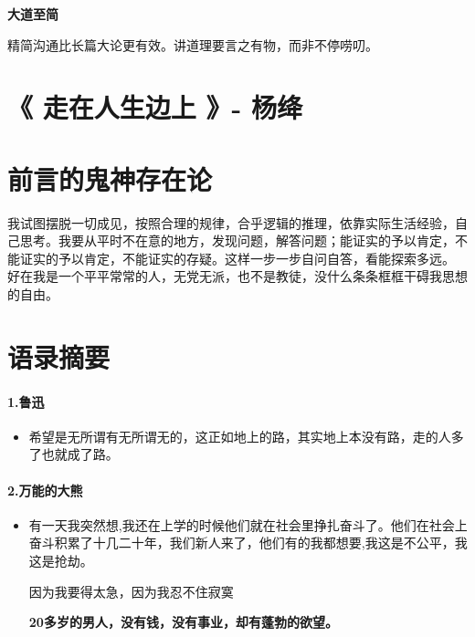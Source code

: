\documentclass[UTF8,a4paper,8pt]{ctexbook}
\begin{document}
		\textbf{大道至简}
		
		精简沟通比长篇大论更有效。讲道理要言之有物，而非不停唠叨。	
\newpage 
\section{《 走在人生边上 》- 杨绛 }
	\section{前言的鬼神存在论}
		我试图摆脱一切成见，按照合理的规律，合乎逻辑的推理，依靠实际生活经验，自己思考。我要从平时不在意的地方，发现问题，解答问题；能证实的予以肯定，不能证实的予以肯定，不能证实的存疑。这样一步一步自问自答，看能探索多远。
		好在我是一个平平常常的人，无党无派，也不是教徒，没什么条条框框干碍我思想的自由。

\newpage
\section{语录摘要}
	\paragraph{1.鲁迅}
		
		\begin{itemize}
			\item 希望是无所谓有无所谓无的，这正如地上的路，其实地上本没有路，走的人多了也就成了路。
		\end{itemize}
		
	\paragraph{2.万能的大熊}
		\begin{itemize}
			\item 有一天我突然想,我还在上学的时候他们就在社会里挣扎奋斗了。他们在社会上奋斗积累了十几二十年，我们新人来了，他们有的我都想要,我这是不公平，我这是抢劫。 
				
			因为我要得太急，因为我忍不住寂寞
				
			\textbf{20多岁的男人，没有钱，没有事业，却有蓬勃的欲望。}
		\end{itemize}
		
\end{document}
